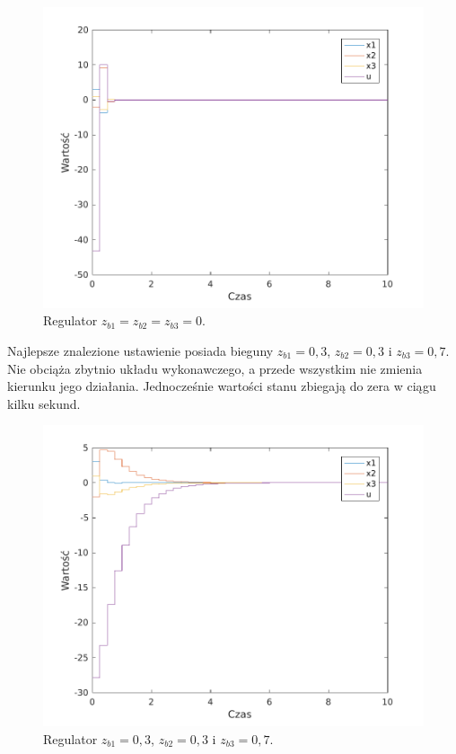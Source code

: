 \begin{figure}[H]
\centering
 \includegraphics[width=\textwidth]{img/plot6.pdf}
\caption{Regulator $z_{b1}=z_{b2}=z_{b3}=0$.}
\end{figure}

Najlepsze znalezione ustawienie posiada bieguny $z_{b1}=0,3$, $z_{b2}=0,3$ i $z_{b3}=0,7$.
Nie obciąża zbytnio układu wykonawczego, a przede wszystkim nie zmienia kierunku jego działania.
Jednocześnie wartości stanu zbiegają do zera w ciągu kilku sekund.

\begin{figure}[H]
\centering
 \includegraphics[width=\textwidth]{img/plot7.pdf}
\caption{Regulator $z_{b1}=0,3$, $z_{b2}=0,3$ i $z_{b3}=0,7$.}
\end{figure}



